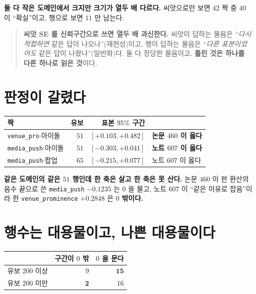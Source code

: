 \documentclass[11pt]{article}
\begin{document}
\textbf{둘 다 작은 도메인에서 크지만 크기가 열두 배 다르다.} 씨앗으로만
보면 $42$ 짝 중 $40$ 이 ``확실''이고, 행으로 보면 $11$ 만 남는다.

\begin{quote}
\textbf{씨앗 SE 를 신뢰구간으로 쓰면 열두 배 과신한다.} 씨앗이 답하는
물음은 ``\emph{다시 적합하면} 같은 답이 나오나''(재현성)이고, 행이 답하는
물음은 ``\emph{다른 표본이었어도} 같은 답이 나왔나''(일반화)다. 둘 다
정당한 물음이고, \textbf{틀린 것은 하나를 다른 하나로 읽은 것}이다.
\end{quote}

\section{판정이 갈렸다}

\begin{center}
\begin{tabular}{lrrl}
\hline
짝 & 유보 & 표본 $95\%$ 구간 & \\
\hline
\texttt{venue\_pro}$\cdot$아이돌 & $51$ & $[+0.103, +0.482]$ & \textbf{논문 $460$ 이 옳다} \\
\texttt{media\_push}$\cdot$아이돌 & $51$ & $[-0.303, \mathbf{+0.041}]$ & \textbf{노트 $607$ 이 옳다} \\
\texttt{media\_push}$\cdot$팝업 & $65$ & $[-0.215, \mathbf{+0.077}]$ & 노트 $607$ 이 옳다 \\
\hline
\end{tabular}
\end{center}

\textbf{같은 도메인의 같은 $51$ 행인데 한 축은 살고 한 축은 못 산다.}
논문 $460$ 이 판 환산의 음수 끝으로 쓴 \texttt{media\_push} $-0.1235$ 는
$0$ 을 물고, 노트 $607$ 이 ``같은 이유로 잡음''이라 한
\texttt{venue\_prominence} $+0.2848$ 은 \textbf{$0$ 밖이다.}

\section{행수는 대용물이고, 나쁜 대용물이다}

\begin{center}
\begin{tabular}{lrr}
\hline
 & 구간이 $0$ 밖 & $0$ 을 문다 \\
\hline
유보 $200$ 이상 & $9$ & $\mathbf{15}$ \\
유보 $200$ 미만 & $\mathbf{2}$ & $16$ \\
\hline
\end{tabular}
\end{center}
\end{document}
